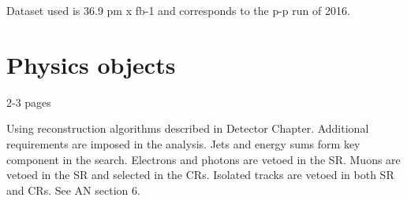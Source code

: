 \begin{comment}
Variable definitions, trigger, selections, binning, signal and control regions, 
background estimations, systematic uncertainties, likelihood model

See AN and paper (old ones too) and theses

This search does not employ specialized reconstruction techniques [36–41] that 
target long-lived gluinos



Inclusive, jets + MET search for new physics
(lots of params in susy)
►Low thresholds of HT > 200 GeV, MHT > 130 GeV, Njet >= 1
►Maximise sensitivity by binning in Njet, Nb, HT, MHT ►Using dedicated 
variables αT, Δφ* to strongly suppress the QCD background ►Data-driven 
estimation of EWK and QCD backgrounds using several control regions

Intro/overview (1-2 pages) to analysis (typical first slide of a presentation) 
- jets plus MET final states, inclusive to wide range of SUSY/DM models, low 
thresholds, binning in 4 variables to maximise sensitivity, QCD suppression, 
data-driven estimations.
Need to mention SR and CRs (muon and dimuon).
Basically need to give 1-2 page overview such that it's clear roughly what our 
cuts are, the dominant backgrounds, the main cuts, the SR and CRs.
Refer to previous analysis results (7, 8 TeV, 2.6, 12.9 fb).

\end{comment}


Dataset used is 36.9 pm x fb-1 and corresponds to the p-p run of 2016.

\section{Physics objects}
2-3 pages

Using reconstruction algorithms described in Detector Chapter.
Additional requirements are imposed in the analysis.
Jets and energy sums form key component in the search.
Electrons and photons are vetoed in the SR.
Muons are vetoed in the SR and selected in the CRs.
Isolated tracks are vetoed in both SR and CRs.
See AN section 6.

